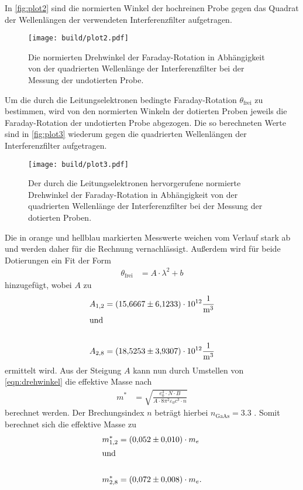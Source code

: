 In \autoref{fig:plot2} sind die normierten Winkel der hochreinen Probe gegen das Quadrat der Wellenlängen der verwendeten Interferenzfilter aufgetragen.
\begin{figure}[H]
  \centering
  \texttt{[image: build/plot2.pdf]}
  \caption {Die normierten Drehwinkel der Faraday-Rotation in Abhängigkeit von der quadrierten Wellenlänge der Interferenzfilter bei der Messung der undotierten Probe.}
  \label{fig:plot2}
\end{figure}

Um die durch die Leitungselektronen bedingte Faraday-Rotation $\theta_{\text{frei}}$ zu bestimmen, wird von den normierten Winkeln der dotierten Proben jeweils
die Faraday-Rotation der undotierten Probe abgezogen.
Die so berechneten Werte sind in \autoref{fig:plot3}
wiederum gegen die quadrierten Wellenlängen der Interferenzfilter aufgetragen.
\begin{figure}[H]
  \centering
  \texttt{[image: build/plot3.pdf]}
  \caption {Der durch die Leitungselektronen hervorgerufene normierte Drehwinkel der Faraday-Rotation in Abhängigkeit von der quadrierten Wellenlänge der Interferenzfilter bei der Messung der dotierten Proben.}
  \label{fig:plot3}
\end{figure}
Die in orange und hellblau markierten Messwerte weichen vom Verlauf stark ab und werden daher für die Rechnung vernachlässigt.
Außerdem wird für beide Dotierungen ein Fit der Form
\begin{align*}
  \theta_{\text{frei}} &= A \cdot \lambda^2+b
\end{align*}
hinzugefügt, wobei $A$ zu
\begin{align*}
  A_{1,2}&= \num{15.6667 \pm 6.1233 e12}\si{\per\cubic\metre}\\
  \shortintertext{und}\\
  A_{2,8}&= \num{18.5253 \pm 3.9307 e12}\si{\per\cubic\metre}
\end{align*}
ermittelt wird.
Aus der Steigung $A$ kann nun durch Umstellen von \autoref{eqn:drehwinkel} die effektive Masse nach
\begin{align*}
  m^* &= \sqrt{\frac{e_0^3\cdot N \cdot B}{A\cdot 8\pi^2\varepsilon_0 c^3 \cdot n }} 
\end{align*}
berechnet werden.
Der Brechungsindex $n$ beträgt hierbei $n_{\text{GaAs}}=\num{3.3}$ \cite{BrechungsindexGaAs}.
Somit berechnet sich die effektive Masse zu
\begin{align*}
  m^*_{1,2}&=(\num{0.052 \pm 0.010}) \cdot m_e \\
  \shortintertext{und}\\
  m^*_{2,8}&=(\num{0.072 \pm 0.008})\cdot m_e.
\end{align*}